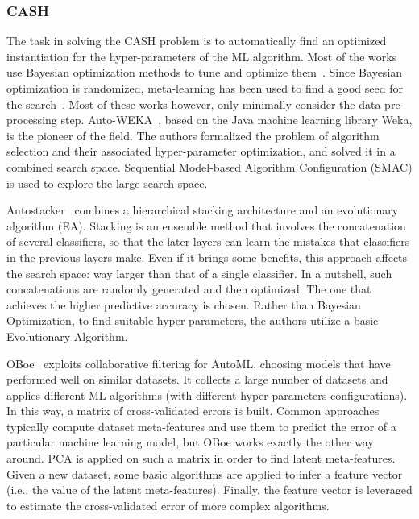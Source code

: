 \subsubsection{CASH} The task in solving the CASH problem is to automatically find an optimized instantiation for the hyper-parameters of the ML algorithm. Most of the works use Bayesian optimization methods to tune and optimize them~\cite{Feurer15AutoSklearn,Thornton13AutoWeka,Olson16Tpot}. Since Bayesian optimization is randomized, meta-learning has been used to find a good seed for the search~\cite{Feurer15AAAI}. Most of these works however, only minimally consider the data pre-processing step.
Auto-WEKA~\cite{Thornton13AutoWeka}, based on the Java machine learning library Weka, is the pioneer of the field.
The authors formalized the problem of algorithm selection and their associated hyper-parameter optimization, and solved it in a combined search space. 
Sequential Model-based Algorithm Configuration (SMAC) is used to explore the large search space.

Autostacker~\cite{chen2018autostacker} combines a hierarchical stacking architecture and an evolutionary algorithm (EA).
Stacking is an ensemble method that involves the concatenation of several classifiers, so that the later layers can learn the mistakes that classifiers in the previous layers make.
Even if it brings some benefits, this approach affects the search space: way larger than that of a single classifier.
In a nutshell, such concatenations are randomly generated and then optimized.
The one that achieves the higher predictive accuracy is chosen.
Rather than Bayesian Optimization, to find suitable hyper-parameters, the authors utilize a basic Evolutionary Algorithm.

OBoe~\cite{yang2019oboe} exploits collaborative filtering for AutoML, choosing models that have performed well on similar datasets.
It collects a large number of datasets and applies different ML algorithms (with different hyper-parameters configurations). 
In this way, a matrix of cross-validated errors is built.
Common approaches typically compute dataset meta-features and use them to predict the error of a particular machine learning model, but OBoe works exactly the other way around.
PCA is applied on such a matrix in order to find latent meta-features.
Given a new dataset, some basic algorithms are applied to infer a feature vector (i.e., the value of the latent meta-features).
Finally, the feature vector is leveraged to estimate the cross-validated error of more complex algorithms.

